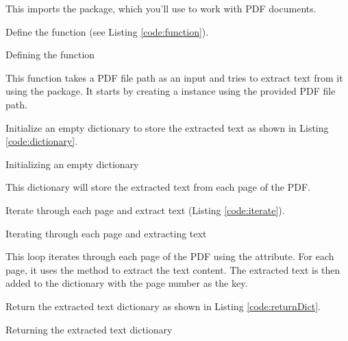 This imports the  package, which you'll use to work with PDF documents.

Define the  function (see Listing \ref{code:function}).

\begin{code}[h!]
	    
	
	\caption{Defining the  function}
	\label{code:function}
\end{code}

This function takes a PDF file path as an input and tries to extract text from it using the  package. It starts by creating a  instance using the provided PDF file path.

Initialize an empty dictionary to store the extracted text as shown in Listing \ref{code:dictionary}.

\begin{code}[h!]
	    
	
	\caption{Initializing an empty dictionary}
	\label{code:dictionary}
\end{code}

This dictionary will store the extracted text from each page of the PDF.

Iterate through each page and extract text (Listing \ref{code:iterate}).

\begin{code}[h!]
	    
	
	\caption{Iterating through each page and extracting text}
	\label{code:iterate}
\end{code}

This loop iterates through each page of the PDF using the  attribute. For each page, it uses the  method to extract the text content. The extracted text is then added to the  dictionary with the page number as the key.

Return the extracted text dictionary as shown in Listing \ref{code:returnDict}.

\begin{code}[h!]
	    
	
	\caption{Returning the extracted text dictionary}
	\label{code:returnDict}
\end{code}

